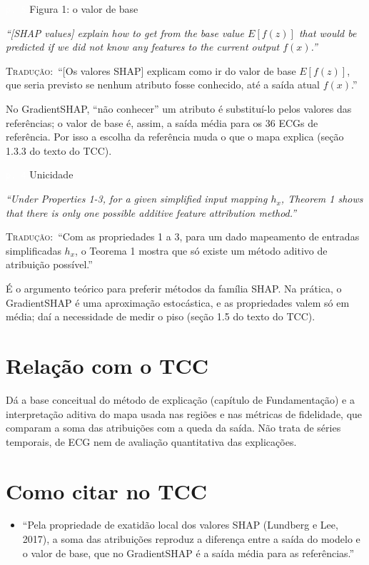 \documentclass[11pt,a4paper]{article}
\newcommand{\pagechip}[1]{{\setlength{\fboxsep}{1.5pt}\colorbox{cAcc}{\textcolor{white}{\scriptsize\texttt{#1}}}}}
\newenvironment{origquote}{\par\itshape\small}{\par}
\newenvironment{tradquote}{\par\small\textsc{Tradução:}\ }{\par}
\newcommand{\explab}[1]{\par\smallskip{\small\color{cAcc}\textbf{\MakeUppercase{#1}}}\par}
\begin{document}
\begin{citacard}{\pagechip{p. 5} Figura 1: o valor de base}
\begin{origquote}“[SHAP values] explain how to get from the base value $E[f(z)]$ that would be predicted if we did not know any features to the current output $f(x)$.”\end{origquote}
\begin{tradquote}“[Os valores SHAP] explicam como ir do valor de base $E[f(z)]$, que seria previsto se nenhum atributo fosse conhecido, até a saída atual $f(x)$.”\end{tradquote}
\explab{Explicação}
No GradientSHAP, ``não conhecer'' um atributo é substituí-lo pelos valores das referências; o valor de base é, assim, a saída média para os 36 ECGs de referência. Por isso a escolha da referência muda o que o mapa explica (seção 1.3.3 do texto do TCC).
\end{citacard}

\begin{citacard}{\pagechip{p. 4} Unicidade}
\begin{origquote}“Under Properties 1-3, for a given simplified input mapping $h_x$, Theorem 1 shows that there is only one possible additive feature attribution method.”\end{origquote}
\begin{tradquote}“Com as propriedades 1 a 3, para um dado mapeamento de entradas simplificadas $h_x$, o Teorema 1 mostra que só existe um método aditivo de atribuição possível.”\end{tradquote}
\explab{Explicação}
É o argumento teórico para preferir métodos da família SHAP. Na prática, o GradientSHAP é uma aproximação estocástica, e as propriedades valem só em média; daí a necessidade de medir o piso (seção 1.5 do texto do TCC).
\end{citacard}

\section{Relação com o TCC}
Dá a base conceitual do método de explicação (capítulo de Fundamentação) e a interpretação aditiva do mapa usada nas regiões e nas métricas de fidelidade, que comparam a soma das atribuições com a queda da saída. Não trata de séries temporais, de ECG nem de avaliação quantitativa das explicações.

\section{Como citar no TCC}
\begin{itemize}
\item ``Pela propriedade de exatidão local dos valores SHAP (Lundberg e Lee, 2017), a soma das atribuições reproduz a diferença entre a saída do modelo e o valor de base, que no GradientSHAP é a saída média para as referências.''
\end{itemize}
\end{document}
